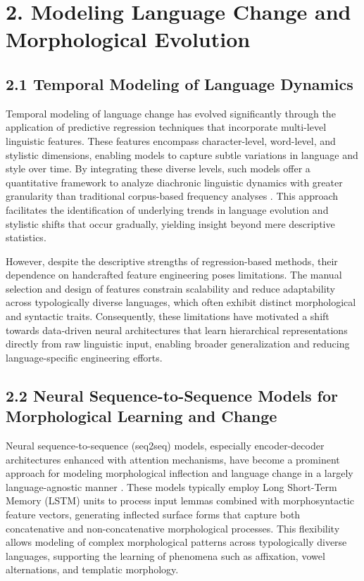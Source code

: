 \documentclass[11pt]{article}
\begin{document}
\section{2. Modeling Language Change and Morphological Evolution}

\subsection{2.1 Temporal Modeling of Language Dynamics}

Temporal modeling of language change has evolved significantly through the application of predictive regression techniques that incorporate multi-level linguistic features. These features encompass character-level, word-level, and stylistic dimensions, enabling models to capture subtle variations in language and style over time. By integrating these diverse levels, such models offer a quantitative framework to analyze diachronic linguistic dynamics with greater granularity than traditional corpus-based frequency analyses \cite{ref41}. This approach facilitates the identification of underlying trends in language evolution and stylistic shifts that occur gradually, yielding insight beyond mere descriptive statistics.

However, despite the descriptive strengths of regression-based methods, their dependence on handcrafted feature engineering poses limitations. The manual selection and design of features constrain scalability and reduce adaptability across typologically diverse languages, which often exhibit distinct morphological and syntactic traits. Consequently, these limitations have motivated a shift towards data-driven neural architectures that learn hierarchical representations directly from raw linguistic input, enabling broader generalization and reducing language-specific engineering efforts.

\subsection{2.2 Neural Sequence-to-Sequence Models for Morphological Learning and Change}

Neural sequence-to-sequence (seq2seq) models, especially encoder-decoder architectures enhanced with attention mechanisms, have become a prominent approach for modeling morphological inflection and language change in a largely language-agnostic manner \cite{ref42}. These models typically employ Long Short-Term Memory (LSTM) units to process input lemmas combined with morphosyntactic feature vectors, generating inflected surface forms that capture both concatenative and non-concatenative morphological processes. This flexibility allows modeling of complex morphological patterns across typologically diverse languages, supporting the learning of phenomena such as affixation, vowel alternations, and templatic morphology.
\end{document}
